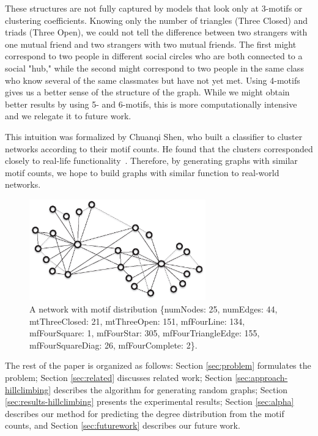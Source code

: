 These structures are not fully captured by models that look only at
3-motifs or clustering coefficients.  Knowing only the number of triangles
(Three Closed) and triads (Three Open), we could not tell the difference
between two strangers with one mutual friend and two strangers with two
mutual friends.  The first might correspond to two people in different
social circles who are both connected to a social "hub," while the
second might correspond to two people in the same class who know
several of the same classmates but have not yet met.  Using 4-motifs gives
us a better sense of the structure of the graph.  While
we might obtain better results by using 5- and 6-motifs, this is more
computationally intensive and we relegate it to future work.

This intuition was formalized by Chuanqi Shen, who built a classifier to
cluster networks according to their motif counts.  He found that the
clusters corresponded closely to real-life functionality~\cite{chuanqi}.
Therefore, by generating graphs with similar motif counts, we hope to build 
graphs with similar function to real-world networks.

\begin{figure}[t]
\centering
\includegraphics[width=3in]{Figures/network.eps}
\caption{A network with motif distribution \{numNodes: 25, numEdges: 44,
mtThreeClosed: 21, mtThreeOpen: 151, mfFourLine: 134,
mfFourSquare: 1, mfFourStar: 305, mfFourTriangleEdge: 155,
mfFourSquareDiag: 26, mfFourComplete: 2\}.}
\label{fig:network}
\end{figure}


The rest of the paper is organized as follows: Section \ref{sec:problem}
formulates the problem; Section \ref{sec:related} discusses related work;
Section \ref{sec:approach-hillclimbing} describes the algorithm for
generating random graphs; Section \ref{sec:results-hillclimbing} presents 
the experimental results; Section \ref{sec:alpha} describes our method for 
predicting the degree distribution from the motif counts, and Section 
\ref{sec:futurework} describes our future work.


